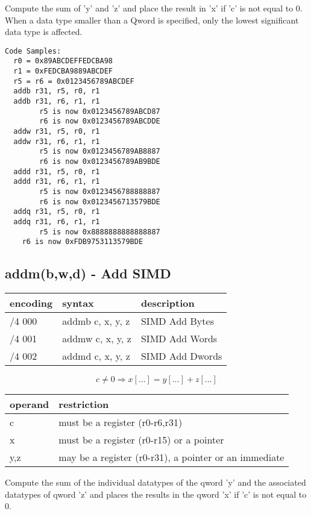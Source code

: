 \documentclass[letterpaper,10pt,openright,twoside,onecolumn]{book}
\begin{document}
  Compute the sum of 'y' and 'z' and place the result in 'x' if
  'c' is not equal to 0.
  When a data type smaller than a Qword is specified, only the
  lowest significant data type is affected.

  \begin{verbatim}
Code Samples:
  r0 = 0x89ABCDEFFEDCBA98
  r1 = 0xFEDCBA9889ABCDEF
  r5 = r6 = 0x0123456789ABCDEF
  addb r31, r5, r0, r1
  addb r31, r6, r1, r1
        r5 is now 0x0123456789ABCD87
        r6 is now 0x0123456789ABCDDE
  addw r31, r5, r0, r1
  addw r31, r6, r1, r1
        r5 is now 0x0123456789AB8887
        r6 is now 0x0123456789AB9BDE
  addd r31, r5, r0, r1
  addd r31, r6, r1, r1
        r5 is now 0x0123456788888887
        r6 is now 0x0123456713579BDE
  addq r31, r5, r0, r1
  addq r31, r6, r1, r1
        r5 is now 0x8888888888888887
	r6 is now 0xFDB9753113579BDE
  \end{verbatim}
\newpage\subsection{addm(b,w,d) - Add SIMD}
  \begin{tabular}{|l|l|l|}
   \hline
    encoding & syntax & description \\
   \hline
    /4 000 & addmb c, x, y, z & SIMD Add Bytes \\
    /4 001 & addmw c, x, y, z & SIMD Add Words \\
    /4 002 & addmd c, x, y, z & SIMD Add Dwords \\
   \hline
  \end{tabular}

  \begin{displaymath} c \neq 0 \Rightarrow x[\ldots] = y[\ldots] + z[\ldots]\end{displaymath}

  \flushleft
  \begin{tabular}{|l|l|}
   \hline
    operand & restriction \\
   \hline
    c & must be a register (r0-r6,r31) \\
    x & must be a register (r0-r15) or a pointer \\
    y,z & may be a register (r0-r31), a pointer or an immediate \\
   \hline
  \end{tabular}

  Compute the sum of the individual datatypes of the qword 'y' and the
  associated datatypes of qword 'z' and places the results in the qword 'x'
  if 'c' is not equal to 0.
\end{document}
